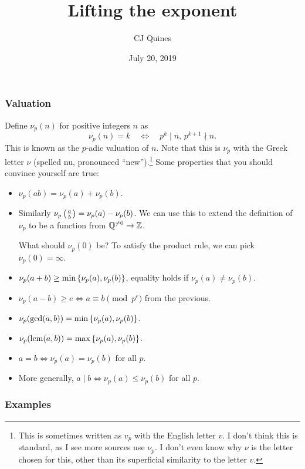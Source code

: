 \documentclass[11pt,paper=letter]{scrartcl}
\begin{document}
\title{Lifting the exponent}

\author{CJ Quines}

\date{July 20, 2019}

\maketitle

\subsubsection*{Valuation}

Define $\nu_p(n)$ for positive integers $n$ as
$$\nu_p(n) = k \quad \iff \quad p^k \mid n,\,p^{k+1}\nmid n.$$
This is known as the $p$-adic valuation of $n$. Note that this is $\nu_p$ with the Greek letter $\nu$ (spelled nu, pronounced ``new'').\footnote{This is sometimes written as $v_p$ with the English letter $v$. I don't think this is standard, as I see more sources use $\nu_p$. I don't even know why $\nu$ is the letter chosen for this, other than its superficial similarity to the letter $v$.} Some properties that you should convince yourself are true:
\begin{itemize}
  \item $\nu_p(ab) = \nu_p(a) + \nu_p(b)$.
  \item Similarly $\nu_p\left( \frac ab \right) = \nu_p(a) - \nu_p(b)$. We can use this to extend the definition of $\nu_p$ to be a function from $\mathbb Q^{\neq 0} \to \mathbb Z$.

  What should $\nu_p(0)$ be? To satisfy the product rule, we can pick $\nu_p(0) = \infty$.

  \item $\nu_p(a + b) \ge \min\left\{ \nu_p(a), \nu_p(b) \right\}$, equality holds if $\nu_p(a) \neq \nu_p(b)$.
  \item $\nu_p(a - b) \ge e \iff a \equiv b \pmod{p^e}$ from the previous.
  \item $\nu_p(\gcd(a, b)) = \min\left\{ \nu_p(a), \nu_p(b) \right\}$.
  \item $\nu_p(\operatorname*{lcm}(a, b)) = \max\left\{ \nu_p(a), \nu_p(b) \right\}$.
  \item $a = b \iff \nu_p(a) = \nu_p(b)$ for all $p$.
  \item More generally, $a \mid b \iff \nu_p(a) \le \nu_p(b)$ for all $p$.
\end{itemize}

\subsubsection*{Examples}
\end{document}
